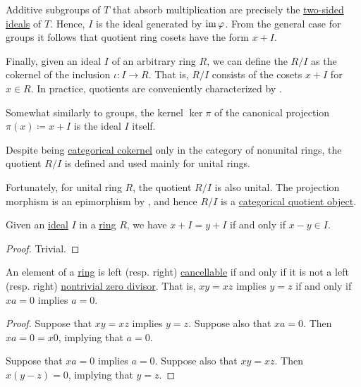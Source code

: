 \begin{definition}
\begin{thmenum}
    Additive subgroups of \( T \) that absorb multiplication are precisely the \hyperref[def:semiring_ideal]{two-sided ideals} of \( T \). Hence, \( I \) is the ideal generated by \( \operatorname{im} \varphi \). From the general case for groups it follows that quotient ring cosets have the form \( x + I \).

    Finally, given an ideal \( I \) of an arbitrary ring \( R \), we can define the  \( R / I \) as the cokernel of the inclusion \( \iota: I \to R \). That is, \( R / I \) consists of the cosets \( x + I \) for \( x \in R \). In practice, quotients are conveniently characterized by .

    Somewhat similarly to groups, the kernel \( \ker \pi \) of the canonical projection \( \pi(x) \coloneqq x + I \) is the ideal \( I \) itself.

    Despite being \hyperref[def:zero_morphisms/cokernel]{categorical cokernel} only in the category of nonunital rings, the quotient \( R / I \) is defined and used mainly for unital rings.

    Fortunately, for unital ring \( R \), the quotient \( R / I \) is also unital. The projection morphism is an epimorphism by , and hence \( R / I \) is a \hyperref[def:subobject_and_quotient]{categorical quotient object}.
  \end{thmenum}
\end{definition}

\begin{proposition}\label{thm:quotient_equality_via_difference}
  Given an \hyperref[def:semiring_ideal]{ideal} \( I \) in a \hyperref[def:ring]{ring} \( R \), we have \( x + I = y + I \) if and only if \( x - y \in I \).
\end{proposition}
\begin{proof}
  Trivial.
\end{proof}

\begin{proposition}\label{thm:semiring_cancellative_iff_no_zero_divisors}
  An element of a \hyperref[def:semiring]{ring} is left (resp. right) \hyperref[def:binary_operation/cancellative]{cancellable} if and only if it is not a left (resp. right) \hyperref[def:divisibility/zero]{nontrivial zero divisor}. That is, \( xy = xz \) implies \( y = z \) if and only if \( xa = 0 \) implies \( a = 0 \).
\end{proposition}
\begin{proof}
  \SufficiencySubProof Suppose that \( xy = xz \) implies \( y = z \). Suppose also that \( xa = 0 \). Then \( xa = 0 = x0 \), implying that \( a = 0 \).

  \NecessitySubProof Suppose that \( xa = 0 \) implies \( a = 0 \). Suppose also that \( xy = xz \). Then \( x(y - z) = 0 \), implying that \( y = z \).
\end{proof}

